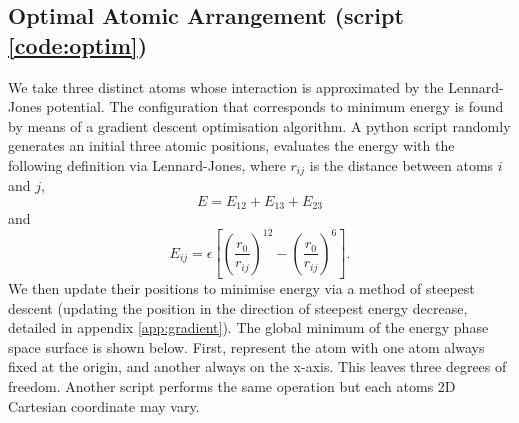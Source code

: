 \documentclass[12pt,a4paper]{article}
\begin{document}
\subsection{Optimal Atomic Arrangement (script \ref{code:optim})} \label{subsec:optimal}
We take three distinct atoms whose interaction is approximated by the Lennard-Jones potential. The configuration that corresponds to minimum energy is found by means of a gradient descent optimisation algorithm. A python script randomly generates an initial three atomic positions, evaluates the energy with the following definition via Lennard-Jones, where $r_{ij}$ is the distance between atoms $i$ and $j$,
\begin{equation}
    E = E_{12} + E_{13} +  E_{23}
\end{equation}
and
\begin{equation}
    E_{ij} = \epsilon \left[ \left(\frac{r_0}{r_{ij}}\right)^{12} - \left(\frac{r_0}{r_{ij}}\right)^6 \right].
\end{equation}
We then update their positions to minimise energy via a method of steepest descent (updating the position in the direction of steepest energy decrease, detailed in appendix \ref{app:gradient}). The global minimum of the energy phase space surface is shown below. First, represent the atom with one atom always fixed at the origin, and another always on the x-axis. This leaves three degrees of freedom. Another script performs the same operation but each atoms 2D Cartesian coordinate may vary.
\end{document}
